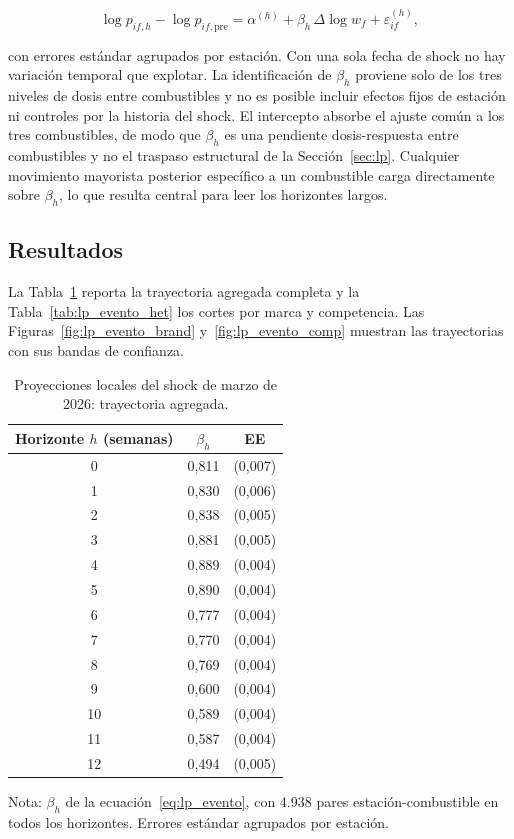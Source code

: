 \documentclass[11pt]{article}
\begin{document}
\begin{equation}
\label{eq:lp_evento}
\log p_{if,h} - \log p_{if,\mathrm{pre}}
= \alpha^{(h)} + \beta_h \, \Delta \log w_f + \varepsilon_{if}^{(h)},
\end{equation}

con errores estándar agrupados por estación. Con una sola fecha de shock no
hay variación temporal que explotar. La identificación de $\beta_h$ proviene
solo de los tres niveles de dosis entre combustibles y no es posible incluir
efectos fijos de estación ni controles por la historia del shock. El
intercepto absorbe el ajuste común a los tres combustibles, de modo que
$\beta_h$ es una pendiente dosis-respuesta entre combustibles y no el
traspaso estructural de la Sección~\ref{sec:lp}. Cualquier movimiento
mayorista posterior específico a un combustible carga directamente sobre
$\beta_h$, lo que resulta central para leer los horizontes largos.

\subsection{Resultados}
\label{sec:lp_evento_resultados}

La Tabla~\ref{tab:lp_evento_pooled} reporta la trayectoria agregada completa
y la Tabla~\ref{tab:lp_evento_het} los cortes por marca y competencia. Las
Figuras~\ref{fig:lp_evento_brand} y~\ref{fig:lp_evento_comp} muestran las
trayectorias con sus bandas de confianza.

\begin{table}[htbp]
\centering
\caption{Proyecciones locales del shock de marzo de 2026: trayectoria
agregada.}
\label{tab:lp_evento_pooled}
\begin{tabular}{ccc}
\toprule
Horizonte $h$ (semanas) & $\beta_h$ & EE \\
\midrule
0  & 0,811 & (0,007) \\
1  & 0,830 & (0,006) \\
2  & 0,838 & (0,005) \\
3  & 0,881 & (0,005) \\
4  & 0,889 & (0,004) \\
5  & 0,890 & (0,004) \\
6  & 0,777 & (0,004) \\
7  & 0,770 & (0,004) \\
8  & 0,769 & (0,004) \\
9  & 0,600 & (0,004) \\
10 & 0,589 & (0,004) \\
11 & 0,587 & (0,004) \\
12 & 0,494 & (0,005) \\
\bottomrule
\end{tabular}

\medskip
\begin{minipage}{0.8\textwidth}
\footnotesize
Nota: $\beta_h$ de la ecuación~\eqref{eq:lp_evento}, con 4.938 pares
estación-combustible en todos los horizontes. Errores estándar agrupados por
estación.
\end{minipage}
\end{table}
\end{document}
